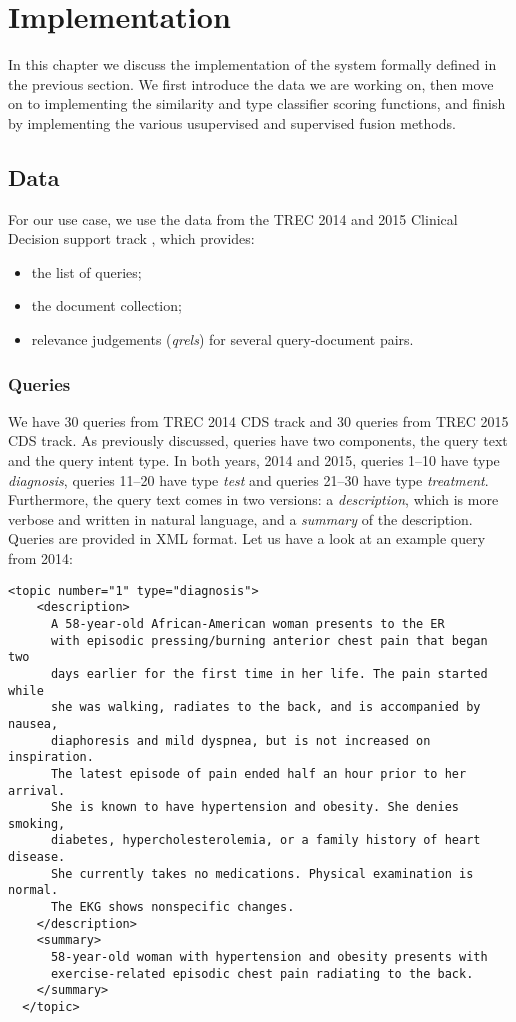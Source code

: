 \chapter{Implementation}\label{impl}

In this chapter we discuss the implementation of the system formally defined in the previous section. We first
introduce the data we are working on, then move on to implementing the similarity and type classifier scoring functions,
and finish by implementing the various usupervised and supervised fusion methods.

\section{Data}
For our use case, we use the data from the TREC 2014 and 2015 Clinical Decision support track \cite{trec}, which provides:
\begin{itemize}
 \item the list of queries;
 \item the document collection;
 \item relevance judgements (\emph{qrels}) for several query-document pairs.
\end{itemize}

\subsection{Queries}
We have 30 queries from TREC 2014 CDS track and 30 queries from TREC 2015 CDS track.
As previously discussed, queries have two components, the query text and the query intent type.
In both years, 2014 and 2015, queries 1--10 have type \emph{diagnosis}, queries 11--20 have type \emph{test}
and queries 21--30 have type \emph{treatment}.
Furthermore, the query text comes in two versions: a \emph{description}, which is more verbose and written in natural language,
and a \emph{summary} of the description. Queries are provided in XML format. 
Let us have a look at an example query from 2014:

\begin{Verbatim}[fontsize=\small]
  <topic number="1" type="diagnosis">
    <description>
      A 58-year-old African-American woman presents to the ER
      with episodic pressing/burning anterior chest pain that began two
      days earlier for the first time in her life. The pain started while
      she was walking, radiates to the back, and is accompanied by nausea,
      diaphoresis and mild dyspnea, but is not increased on inspiration.
      The latest episode of pain ended half an hour prior to her arrival.
      She is known to have hypertension and obesity. She denies smoking,
      diabetes, hypercholesterolemia, or a family history of heart disease.
      She currently takes no medications. Physical examination is normal.
      The EKG shows nonspecific changes.
    </description>
    <summary>
      58-year-old woman with hypertension and obesity presents with
      exercise-related episodic chest pain radiating to the back.
    </summary>
  </topic>
\end{Verbatim}

